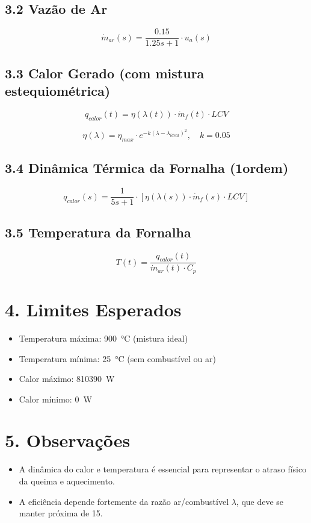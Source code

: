 \documentclass[12pt]{article}
\begin{document}
\subsection*{3.2 Vaz\~ao de Ar}
\begin{equation}
\dot{m}_{ar}(s) = \frac{0.15}{1.25s + 1} \cdot u_a(s)
\end{equation}

\subsection*{3.3 Calor Gerado (com mistura estequiom\'etrica)}
\begin{equation}
q_{calor}(t) = \eta(\lambda(t)) \cdot \dot{m}_f(t) \cdot LCV
\end{equation}

\begin{equation}
\eta(\lambda) = \eta_{max} \cdot e^{-k(\lambda - \lambda_{ideal})^2}, \quad k = 0.05
\end{equation}

\subsection*{3.4 Din\^amica T\'ermica da Fornalha (1\textordfeminine ordem)}
\begin{equation}
q_{calor}(s) = \frac{1}{5s + 1} \cdot \left[ \eta(\lambda(s)) \cdot \dot{m}_f(s) \cdot LCV \right]
\end{equation}

\subsection*{3.5 Temperatura da Fornalha}
\begin{equation}
T(t) = \frac{q_{calor}(t)}{\dot{m}_{ar}(t) \cdot C_p}
\end{equation}

\section*{4. Limites Esperados}
\begin{itemize}
    \item Temperatura m\'axima: \SI{900}{\celsius} (mistura ideal)
    \item Temperatura m\'inima: \SI{25}{\celsius} (sem combust\'ivel ou ar)
    \item Calor m\'aximo: \SI{810390}{W}
    \item Calor m\'inimo: \SI{0}{W}
\end{itemize}

\section*{5. Observa\c{c}\~oes}
\begin{itemize}
    \item A din\^amica do calor e temperatura \'e essencial para representar o atraso f\'isico da queima e aquecimento.
    \item A efici\^encia depende fortemente da raz\~ao ar/combust\'ivel \(\lambda\), que deve se manter pr\'oxima de 15.
\end{itemize}
\end{document}
